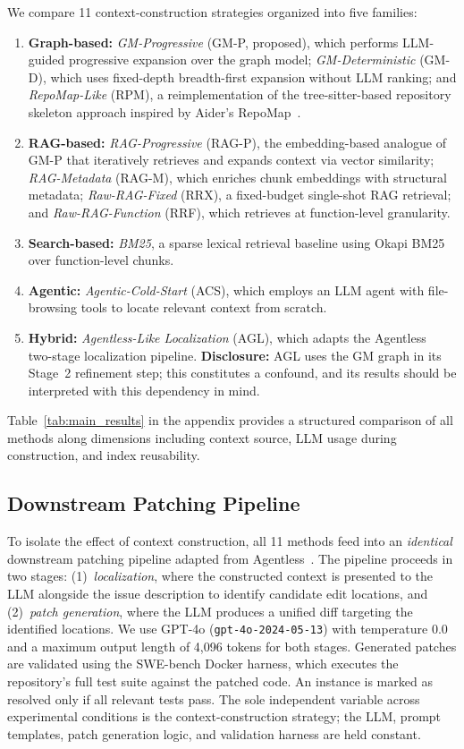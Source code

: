 We compare 11 context-construction strategies organized into five families:

\begin{enumerate}
    \item \textbf{Graph-based:} \emph{GM-Progressive} (GM-P, proposed), which performs LLM-guided progressive expansion over the graph model; \emph{GM-Deterministic} (GM-D), which uses fixed-depth breadth-first expansion without LLM ranking; and \emph{RepoMap-Like} (RPM), a reimplementation of the tree-sitter-based repository skeleton approach inspired by Aider's RepoMap~\cite{aider2024repomap}.
    \item \textbf{RAG-based:} \emph{RAG-Progressive} (RAG-P), the embedding-based analogue of GM-P that iteratively retrieves and expands context via vector similarity; \emph{RAG-Metadata} (RAG-M), which enriches chunk embeddings with structural metadata; \emph{Raw-RAG-Fixed} (RRX), a fixed-budget single-shot RAG retrieval; and \emph{Raw-RAG-Function} (RRF), which retrieves at function-level granularity.
    \item \textbf{Search-based:} \emph{BM25}, a sparse lexical retrieval baseline using Okapi BM25 over function-level chunks.
    \item \textbf{Agentic:} \emph{Agentic-Cold-Start} (ACS), which employs an LLM agent with file-browsing tools to locate relevant context from scratch.
    \item \textbf{Hybrid:} \emph{Agentless-Like Localization} (AGL), which adapts the Agentless~\cite{xia2024agentless} two-stage localization pipeline. \textbf{Disclosure:} AGL uses the GM graph in its Stage~2 refinement step; this constitutes a confound, and its results should be interpreted with this dependency in mind.
\end{enumerate}

\noindent Table~\ref{tab:main_results} in the appendix provides a structured comparison of all methods along dimensions including context source, LLM usage during construction, and index reusability.

\subsection{Downstream Patching Pipeline}

To isolate the effect of context construction, all 11 methods feed into an \emph{identical} downstream patching pipeline adapted from Agentless~\cite{xia2024agentless}. The pipeline proceeds in two stages: (1)~\emph{localization}, where the constructed context is presented to the LLM alongside the issue description to identify candidate edit locations, and (2)~\emph{patch generation}, where the LLM produces a unified diff targeting the identified locations. We use GPT-4o (\texttt{gpt-4o-2024-05-13}) with temperature 0.0 and a maximum output length of 4{,}096 tokens for both stages. Generated patches are validated using the SWE-bench Docker harness, which executes the repository's full test suite against the patched code. An instance is marked as resolved only if all relevant tests pass. The sole independent variable across experimental conditions is the context-construction strategy; the LLM, prompt templates, patch generation logic, and validation harness are held constant.

